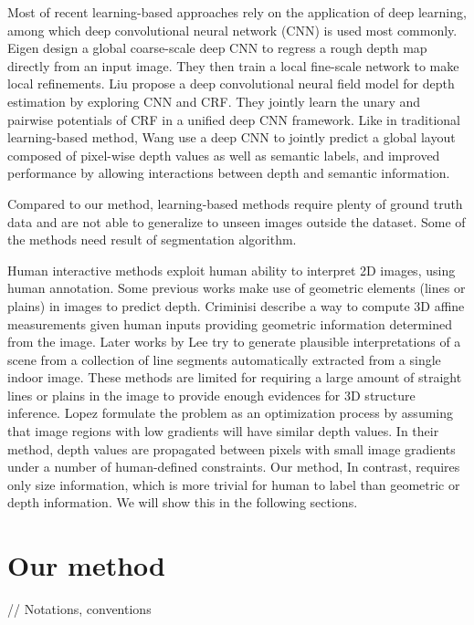 \documentclass[10pt,twocolumn,letterpaper]{article}
\begin{document}
Most of recent learning-based approaches rely on the application of deep learning, among which deep convolutional neural network (CNN) is used most commonly. Eigen \etal \cite{DBLP:journals/corr/EigenPF14} design a global coarse-scale deep CNN to regress a rough depth map directly from an input image. They then train a local fine-scale network to make local refinements. Liu \etal \cite{Liu_2015_CVPR} propose a deep convolutional neural field model for depth estimation by exploring CNN and  CRF. They jointly learn the unary and pairwise potentials of CRF in a unified deep CNN framework. Like in traditional learning-based method, Wang \etal \cite{Wang_2015_CVPR} use a deep CNN to jointly predict a global layout composed of pixel-wise depth values as well as semantic labels, and improved performance by allowing interactions between depth and semantic information. 

Compared to our method, learning-based methods require plenty of ground truth data and are not able to generalize to unseen images outside the dataset. Some of the methods \cite{Liu+al:CVPR10, Wang_2015_CVPR} need result of segmentation algorithm.

Human interactive methods exploit human ability to interpret 2D images, using human annotation. Some previous works make use of geometric elements (lines or plains) in images to predict depth. Criminisi \etal \cite{Criminisi2000} describe a way to compute 3D affine measurements given human inputs providing geometric information determined from the image. Later works \cite{Lee2009GeometricRF} by Lee \etal try to generate plausible interpretations of a scene from a collection of line segments automatically extracted from a single indoor image. These methods are limited for requiring a large amount of straight lines or plains in the image to provide enough evidences for 3D structure inference. Lopez \etal \cite{ceig.20141109} formulate the problem as an optimization process by assuming that image regions with low gradients will have similar depth values. In their method, depth values are propagated between pixels with small image gradients under a number of human-defined constraints. Our method, In contrast, requires only size information, which is more trivial for human to label than geometric or depth information. We will show this in the following sections.

\section{Our method}
// Notations, conventions
\end{document}
